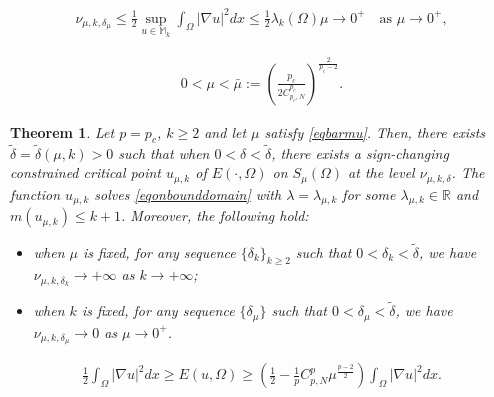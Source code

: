 \documentclass[10pt,a4paper]{amsart}
\newtheorem{theorem}{Theorem}
\newcommand{\R}{\mathbb{R}}
\newcommand{\la}{\lambda}
\begin{document}
    \begin{align} \label{eq7.8}
    	\nu_{\mu,k,\delta_\mu} \le \frac12 \sup_{u \in \mathbb{M}_k}\int_\Omega |\nabla u|^2dx \le \frac12\la_k(\Omega) \mu \to 0^+ \quad \text{as } \mu \to 0^+,
    \end{align}

\begin{align} \label{eqbarmu}
	0 < \mu < \bar\mu := \left( \frac{p_c}{2C_{p_c,N}^{p_c}}\right) ^{\frac{2}{p_c-2}}.
\end{align}

\begin{theorem} \label{thmgenuscri}
	Let $p = p_c$, $k \geq 2$ and let $\mu$ satisfy \eqref{eqbarmu}. Then,
	there exists $\tilde \delta = \tilde \delta(\mu,k) > 0$ such that when $0 < \delta < \tilde \delta$, there exists a sign-changing constrained critical point $u_{\mu,k}$ of $E(\cdot,\Omega)$ on $S_\mu(\Omega)$ at the level $\nu_{\mu,k,\delta}$. The function $u_{\mu,k}$ solves \eqref{eqonbounddomain} with $\la = \la_{\mu,k}$ for some $\la_{\mu,k} \in \R$ and $m(u_{\mu,k}) \le k+1$. Moreover, the following hold:
	\begin{itemize}
		\item when $\mu$ is fixed, for any sequence $\{\delta_k\}_{k \ge 2}$ such that $0 < \delta_k < \tilde \delta$, we have $\nu_{\mu,k,\delta_k} \to +\infty$ as $k \to +\infty$;
		\item when $k$ is fixed, for any sequence $\{\delta_\mu\}$ such that $0 < \delta_\mu < \tilde \delta$, we have $\nu_{\mu,k,\delta_\mu} \to 0$ as $\mu \to 0^+$.
	\end{itemize}
\end{theorem}

	\begin{align} \label{eq5.3two}
		\frac12 \int_\Omega |\nabla u|^2dx \ge E(u,\Omega) \geq \left( \frac12 - \frac1p C_{p,N}^p \mu^{\frac{p-2}{2}}\right)  \int_\Omega |\nabla u|^2dx.
	\end{align}
\end{document}
